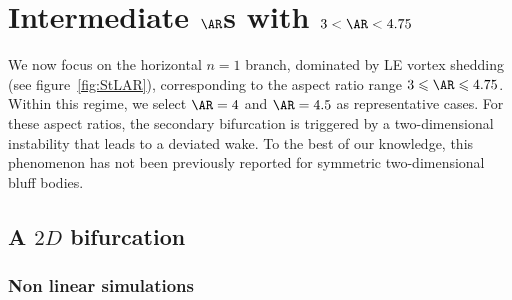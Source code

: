 \section{Intermediate $\AR$s with $3 < \AR < 4.75$}
\label{sec:int}

We now focus on the horizontal $n=1$ branch, dominated by LE vortex shedding (see figure~\ref{fig:StLAR}), corresponding to the aspect ratio range $3 \leq \AR \leq 4.75$. Within this regime, we select $\AR=4$ and $\AR=4.5$ as representative cases. For these aspect ratios, the secondary bifurcation is triggered by a two-dimensional instability that leads to a deviated wake. To the best of our knowledge, this phenomenon has not been previously reported for symmetric two-dimensional bluff bodies.

\subsection{A $2D$ bifurcation}

\subsubsection{Non linear simulations}


